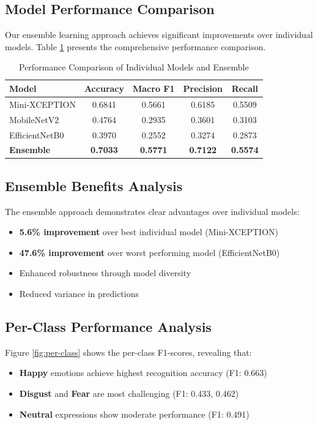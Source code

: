 \subsection{Model Performance Comparison}
Our ensemble learning approach achieves significant improvements over individual models. Table \ref{tab:results} presents the comprehensive performance comparison.

\begin{table}[h]
\centering
\caption{Performance Comparison of Individual Models and Ensemble}
\label{tab:results}
\begin{tabular}{|l|c|c|c|c|}
\hline
\textbf{Model} & \textbf{Accuracy} & \textbf{Macro F1} & \textbf{Precision} & \textbf{Recall} \\
\hline
Mini-XCEPTION & 0.6841 & 0.5661 & 0.6185 & 0.5509 \\
MobileNetV2 & 0.4764 & 0.2935 & 0.3601 & 0.3103 \\
EfficientNetB0 & 0.3970 & 0.2552 & 0.3274 & 0.2873 \\
\textbf{Ensemble} & \textbf{0.7033} & \textbf{0.5771} & \textbf{0.7122} & \textbf{0.5574} \\
\hline
\end{tabular}
\end{table}

\subsection{Ensemble Benefits Analysis}
The ensemble approach demonstrates clear advantages over individual models:
\begin{itemize}
    \item \textbf{5.6\% improvement} over best individual model (Mini-XCEPTION)
    \item \textbf{47.6\% improvement} over worst performing model (EfficientNetB0)
    \item Enhanced robustness through model diversity
    \item Reduced variance in predictions
\end{itemize}

\subsection{Per-Class Performance Analysis}
Figure \ref{fig:per-class} shows the per-class F1-scores, revealing that:
\begin{itemize}
    \item \textbf{Happy} emotions achieve highest recognition accuracy (F1: 0.663)
    \item \textbf{Disgust} and \textbf{Fear} are most challenging (F1: 0.433, 0.462)
    \item \textbf{Neutral} expressions show moderate performance (F1: 0.491)
\end{itemize}

